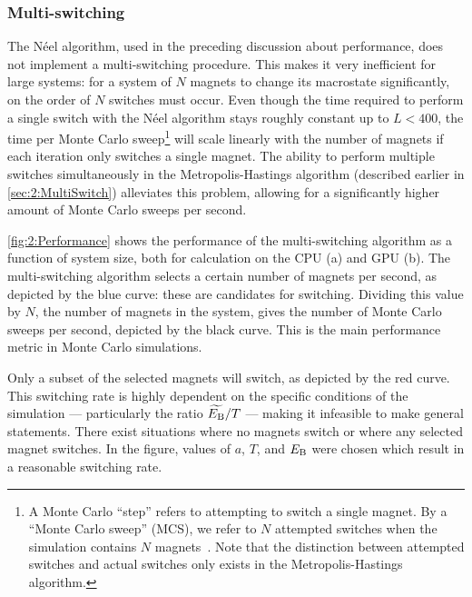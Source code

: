 \subsubsection{Multi-switching}
The N\'eel algorithm, used in the preceding discussion about performance, does not implement a multi-switching procedure.
This makes it very inefficient for large systems: for a system of $N$ magnets to change its macrostate significantly, on the order of $N$ switches must occur.
Even though the time required to perform a single switch with the N\'eel algorithm stays roughly constant up to $L<400$, the time per Monte Carlo sweep\footnote{
	A Monte Carlo ``step'' refers to attempting to switch a single magnet. By a ``Monte Carlo sweep'' (MCS), we refer to $N$ attempted switches when the simulation contains $N$ magnets~\cite{NumericalDynamicalNiedermayer}. Note that the distinction between attempted switches and actual switches only exists in the Metropolis-Hastings algorithm. %
} will scale linearly with the number of magnets if each iteration only switches a single magnet.
The ability to perform multiple switches simultaneously in the Metropolis-Hastings algorithm (described earlier in \cref{sec:2:MultiSwitch}) alleviates this problem, allowing for a significantly higher amount of Monte Carlo sweeps per second. \\\par
\cref{fig:2:Performance} shows the performance of the multi-switching algorithm as a function of system size, both for calculation on the CPU (a) and GPU (b).
The multi-switching algorithm selects a certain number of magnets per second, as depicted by the blue curve: these are candidates for switching.
Dividing this value by $N$, the number of magnets in the system, gives the number of Monte Carlo sweeps per second, depicted by the black curve.
This is the main performance metric in Monte Carlo simulations. \par
Only a subset of the selected magnets will switch, as depicted by the red curve.
This switching rate is highly dependent on the specific conditions of the simulation --- particularly the ratio $\widetilde{E_\mathrm{B}}/T$ --- making it infeasible to make general statements.
There exist situations where no magnets switch or where any selected magnet switches.
In the figure, values of $a$, $T$, and $E_\mathrm{B}$ were chosen which result in a reasonable switching rate.



